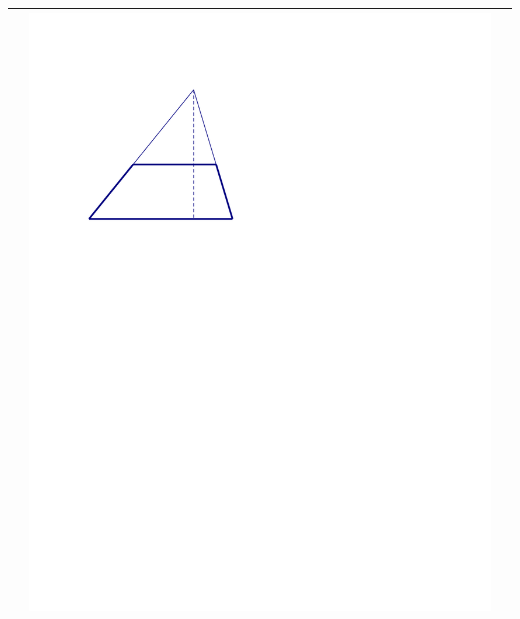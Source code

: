 \documentclass{ximera}
\begin{document}
\begin{problem}
{\begin{tabular}{|>{\centering\arraybackslash}m{2.5cm}|>{\centering\arraybackslash}m{9.5cm}|c|}
          & \includegraphics[scale=0.7]{./graphics/trapezoid6.pdf}&  \hspace{\formulawidth} \\ \hline
\end{tabular}}

\end{problem}
\end{document}
